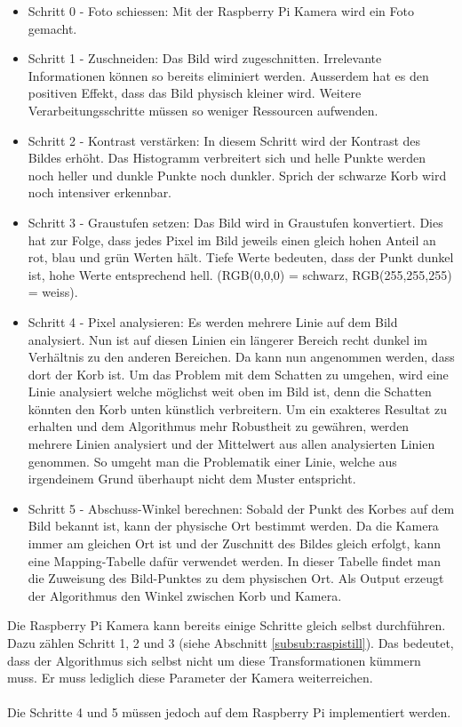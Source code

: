 \begin{itemize}
	\item Schritt 0 - Foto schiessen: Mit der Raspberry Pi Kamera wird ein Foto gemacht.
	
	\item Schritt 1 - Zuschneiden: Das Bild wird zugeschnitten. Irrelevante Informationen können so bereits eliminiert werden. Ausserdem hat es den positiven Effekt, dass das Bild physisch kleiner wird. Weitere Verarbeitungsschritte müssen so weniger Ressourcen aufwenden. 
	
	\item Schritt 2 - Kontrast verstärken: In diesem Schritt wird der Kontrast des Bildes erhöht. Das Histogramm verbreitert sich und helle Punkte werden noch heller und dunkle Punkte noch dunkler. Sprich der schwarze Korb wird noch intensiver erkennbar. 
	
	\item Schritt 3 - Graustufen setzen: Das Bild wird in Graustufen konvertiert. Dies hat zur Folge, dass jedes Pixel im Bild jeweils einen gleich hohen Anteil an rot, blau und grün Werten hält. Tiefe Werte bedeuten, dass der Punkt dunkel ist, hohe Werte entsprechend hell. (RGB(0,0,0) = schwarz, RGB(255,255,255) = weiss).
	
	\item Schritt 4 - Pixel analysieren: Es werden mehrere Linie auf dem Bild analysiert. Nun ist auf diesen Linien ein längerer Bereich recht dunkel im Verhältnis zu den anderen Bereichen. Da kann nun angenommen werden, dass dort der Korb ist. Um das Problem mit dem Schatten zu umgehen, wird eine Linie analysiert welche möglichst weit oben im Bild ist, denn die Schatten könnten den Korb unten künstlich verbreitern. Um ein exakteres Resultat zu erhalten und dem Algorithmus mehr Robustheit zu gewähren, werden mehrere Linien analysiert und der Mittelwert aus allen analysierten Linien genommen. So umgeht man die Problematik einer Linie, welche aus irgendeinem Grund überhaupt nicht dem Muster entspricht.
	
	\item Schritt 5 - Abschuss-Winkel berechnen: Sobald der Punkt des Korbes auf dem Bild bekannt ist, kann der physische Ort bestimmt werden. Da die Kamera immer am gleichen Ort ist und der Zuschnitt des Bildes gleich erfolgt, kann eine Mapping-Tabelle dafür verwendet werden. In dieser Tabelle findet man die Zuweisung des Bild-Punktes zu dem physischen Ort. Als Output erzeugt der Algorithmus den Winkel zwischen Korb und Kamera.
\end{itemize} 
Die Raspberry Pi Kamera kann bereits einige Schritte gleich selbst durchführen. Dazu zählen Schritt 1, 2 und 3 (siehe Abschnitt \ref{subsub:raspistill}). Das bedeutet, dass der Algorithmus sich selbst nicht um diese Transformationen kümmern muss. Er muss lediglich diese Parameter der Kamera weiterreichen.\\
\\
Die Schritte 4 und 5 müssen jedoch auf dem Raspberry Pi implementiert werden.


